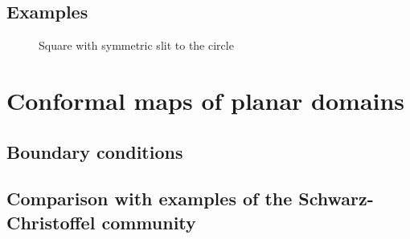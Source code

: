 \subsection{Examples}
\begin{figure}
\centering
{}
\caption{Square with symmetric slit to the circle}
\label{fig:slit_circle}
\end{figure}


\section{Conformal maps of planar domains}
\label{sec:planar_domains}
\subsection{Boundary conditions}
\subsection{Comparison with examples of the Schwarz-Christoffel community}

